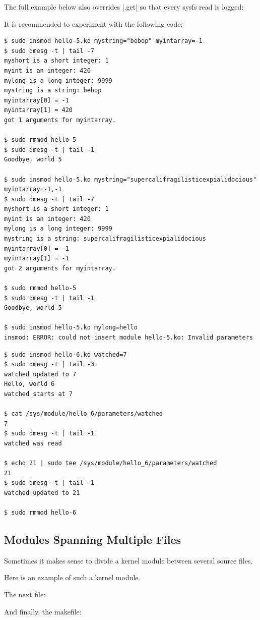 \documentclass[10pt, oneside]{book}
\begin{document}
The full example below also overrides \cpp|.get| so that every sysfs read is logged:

It is recommended to experiment with the following code:
\begin{verbatim}
$ sudo insmod hello-5.ko mystring="bebop" myintarray=-1
$ sudo dmesg -t | tail -7
myshort is a short integer: 1
myint is an integer: 420
mylong is a long integer: 9999
mystring is a string: bebop
myintarray[0] = -1
myintarray[1] = 420
got 1 arguments for myintarray.

$ sudo rmmod hello-5
$ sudo dmesg -t | tail -1
Goodbye, world 5

$ sudo insmod hello-5.ko mystring="supercalifragilisticexpialidocious" myintarray=-1,-1
$ sudo dmesg -t | tail -7
myshort is a short integer: 1
myint is an integer: 420
mylong is a long integer: 9999
mystring is a string: supercalifragilisticexpialidocious
myintarray[0] = -1
myintarray[1] = -1
got 2 arguments for myintarray.

$ sudo rmmod hello-5
$ sudo dmesg -t | tail -1
Goodbye, world 5

$ sudo insmod hello-5.ko mylong=hello
insmod: ERROR: could not insert module hello-5.ko: Invalid parameters
\end{verbatim}

\begin{verbatim}
$ sudo insmod hello-6.ko watched=7
$ sudo dmesg -t | tail -3
watched updated to 7
Hello, world 6
watched starts at 7

$ cat /sys/module/hello_6/parameters/watched
7
$ sudo dmesg -t | tail -1
watched was read

$ echo 21 | sudo tee /sys/module/hello_6/parameters/watched
21
$ sudo dmesg -t | tail -1
watched updated to 21

$ sudo rmmod hello-6
\end{verbatim}

\subsection{Modules Spanning Multiple Files}
\label{sec:modfiles}
Sometimes it makes sense to divide a kernel module between several source files.

Here is an example of such a kernel module.

The next file:

And finally, the makefile:
\end{document}
